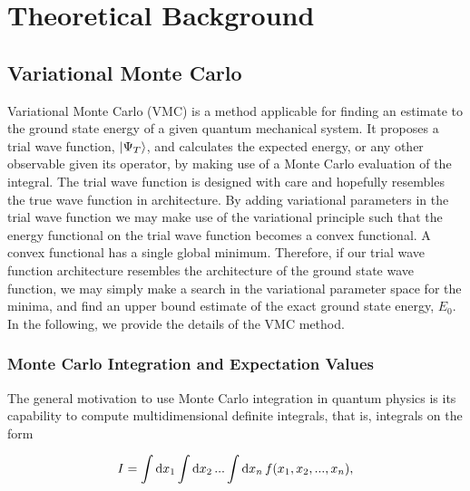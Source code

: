 \section{Theoretical Background}\label{sec:Theory}

\subsection{Variational Monte Carlo}

Variational Monte Carlo (VMC) is a method applicable for finding an estimate to the ground state energy of a given quantum mechanical system. It proposes a trial wave function, $\ket{\Psi_T}$, and calculates the expected energy, or any other observable given its operator, by making use of a Monte Carlo evaluation of the integral. The trial wave function is designed with care and hopefully resembles the true wave function in architecture. By adding variational parameters in the trial wave function we may make use of the variational principle such that the energy functional on the trial wave function becomes a convex functional. A convex functional has a single global minimum. Therefore, if our trial wave function architecture resembles the architecture of the ground state wave function, we may simply make a search in the variational parameter space for the minima, and find an upper bound estimate of the exact ground state energy, $E_0$. In the following, we provide the details of the VMC method. 

\subsubsection{Monte Carlo Integration and Expectation Values}

The general motivation to use Monte Carlo integration in quantum physics is its capability to compute multidimensional definite integrals, that is, integrals on the form 

\begin{equation*}
    I = \int \dd{x_1} \int \dd{x_2} ... \int \dd{x_n} f \qty(x_1, x_2, ..., x_n),
\end{equation*}

